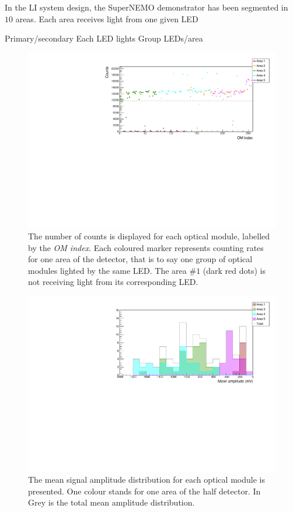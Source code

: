 In the LI system design, the SuperNEMO demonstrator has been segmented in $10$ areas.
Each area receives light from one given LED

Primary/secondary
Each LED lights
Group LEDs/area

\begin{figure}[h]
  \centering
  \includegraphics[width=15cm]{commissioning/fig_commissioning/LI_1d_counts.pdf}
  \caption{The number of counts is displayed for each optical module, labelled by the \emph{OM index}.
    Each coloured marker represents counting rates for one area of the detector, that is to say one group of optical modules lighted by the same LED.
    The area \#$1$ (dark red dots) is not receiving light from its corresponding LED.
    \label{fig:LI_counts}}
\end{figure}


\begin{figure}[h]
  \centering
  \includegraphics[width=15cm]{commissioning/fig_commissioning/LI_mean_ampl.pdf}
  \caption{The mean signal amplitude distribution for each optical module is presented.
    One colour stands for one area of the half detector.
    In Grey is the total mean amplitude distribution.
    \label{fig:LI_ampl}}
\end{figure}


